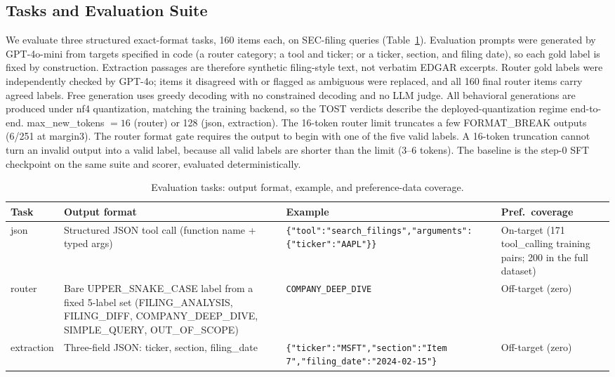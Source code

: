 \documentclass{article}
\begin{document}
\subsection{Tasks and Evaluation Suite}
\label{sec:tasks}
We evaluate three structured exact-format tasks, 160 items each, on SEC-filing queries (Table~\ref{tab:tasks}). Evaluation prompts were generated by GPT-4o-mini from targets specified in code (a router category; a tool and ticker; or a ticker, section, and filing date), so each gold label is fixed by construction. Extraction passages are therefore synthetic filing-style text, not verbatim EDGAR excerpts. Router gold labels were independently checked by GPT-4o; items it disagreed with or flagged as ambiguous were replaced, and all 160 final router items carry agreed labels. Free generation uses greedy decoding with no constrained decoding and no LLM judge. All behavioral generations are produced under nf4 quantization, matching the training backend, so the TOST verdicts describe the deployed-quantization regime end-to-end. max\_new\_tokens $= 16$ (router) or 128 (json, extraction). The 16-token router limit truncates a few FORMAT\_BREAK outputs (6/251 at margin3). The router format gate requires the output to begin with one of the five valid labels. A 16-token truncation cannot turn an invalid output into a valid label, because all valid labels are shorter than the limit (3--6 tokens). The baseline is the step-0 SFT checkpoint on the same suite and scorer, evaluated deterministically.

\begin{table}[H]
\centering
\caption{Evaluation tasks: output format, example, and preference-data coverage.}
\label{tab:tasks}
\small
\setlength{\tabcolsep}{4pt}
\begin{tabular}{@{}>{\raggedright\arraybackslash}p{1.5cm}>{\raggedright\arraybackslash}p{4.0cm}>{\raggedright\arraybackslash}p{3.4cm}>{\raggedright\arraybackslash}p{2.5cm}@{}}
\toprule
\textbf{Task} & \textbf{Output format} & \textbf{Example} & \textbf{Pref.\ coverage}\\
\midrule
json & Structured JSON tool call (function name + typed args) & \texttt{\small \{"tool":\newline"search\_filings",\newline"arguments":\newline\{"ticker":"AAPL"\}\}} & On-target (171 tool\_calling training pairs; 200 in the full dataset)\\
router & Bare UPPER\_SNAKE\_CASE label from a fixed 5-label set (FILING\_ANALYSIS, FILING\_DIFF, COMPANY\_DEEP\_DIVE, SIMPLE\_QUERY, OUT\_OF\_SCOPE) & \texttt{\small COMPANY\_\allowbreak DEEP\_DIVE} & Off-target (zero)\\
extraction & Three-field JSON: ticker, section, filing\_date & \texttt{\small \{"ticker":"MSFT",\newline "section":"Item 7",\newline "filing\_date":\newline "2024-02-15"\}} & Off-target (zero)\\
\bottomrule
\end{tabular}
\end{table}
\end{document}
